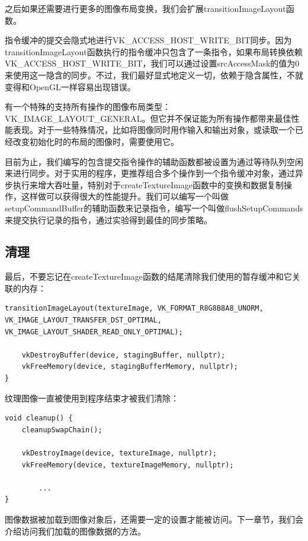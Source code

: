 \documentclass{ctexart}
\begin{document}
之后如果还需要进行更多的图像布局变换，我们会扩展transitionImageLayout函数。

指令缓冲的提交会隐式地进行VK\_ACCESS\_HOST\_WRITE\_BIT同步。因为transitionImageLayout函数执行的指令缓冲只包含了一条指令，如果布局转换依赖VK\_ACCESS\_HOST\_WRITE\_BIT，我们可以通过设置srcAccessMask的值为0来使用这一隐含的同步。不过，我们最好显式地定义一切，依赖于隐含属性，不就变得和OpenGL一样容易出现错误。

有一个特殊的支持所有操作的图像布局类型：VK\_IMAGE\_LAYOUT\_GENERAL。但它并不保证能为所有操作都带来最佳性能表现。对于一些特殊情况，比如将图像同时用作输入和输出对象，或读取一个已经改变初始化时的布局的图像时，需要使用它。

目前为止，我们编写的包含提交指令操作的辅助函数都被设置为通过等待队列空闲来进行同步。对于实用的程序，更推荐组合多个操作到一个指令缓冲对象，通过异步执行来增大吞吐量，特别对于createTextureImage函数中的变换和数据复制操作，这样做可以获得很大的性能提升。我们可以编写一个叫做setupCommandBuffer的辅助函数来记录指令，编写一个叫做flushSetupCommands来提交执行记录的指令，通过实验得到最佳的同步策略。

\subsection{清理}

最后，不要忘记在createTextureImage函数的结尾清除我们使用的暂存缓冲和它关联的内存：

\begin{lstlisting}[language={[ANSI]C}]
	transitionImageLayout(textureImage, VK_FORMAT_R8G8B8A8_UNORM, VK_IMAGE_LAYOUT_TRANSFER_DST_OPTIMAL, VK_IMAGE_LAYOUT_SHADER_READ_ONLY_OPTIMAL);

	vkDestroyBuffer(device, stagingBuffer, nullptr);
	vkFreeMemory(device, stagingBufferMemory, nullptr);
}
\end{lstlisting}

纹理图像一直被使用到程序结束才被我们清除：

\begin{lstlisting}[language={[ANSI]C}]
void cleanup() {
	cleanupSwapChain();

	vkDestroyImage(device, textureImage, nullptr);
	vkFreeMemory(device, textureImageMemory, nullptr);

		...
}
\end{lstlisting}

图像数据被加载到图像对象后，还需要一定的设置才能被访问。下一章节，我们会介绍访问我们加载的图像数据的方法。
\end{document}
